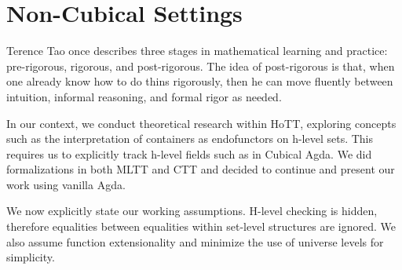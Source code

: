 \section{Non-Cubical Settings}

Terence Tao once describes three stages in mathematical learning and practice: pre-rigorous, rigorous, and post-rigorous. The idea of post-rigorous is that, when one already know how to do thins rigorously, then he can move fluently between intuition, informal reasoning, and formal rigor as needed.

In our context, we conduct theoretical research within HoTT, exploring concepts such as the interpretation of containers as endofunctors on h-level sets. This requires us to explicitly track h-level fields such as  in Cubical Agda. We did formalizations in both MLTT and CTT and decided to continue and present our work using vanilla Agda.

We now explicitly state our working assumptions. H-level checking is hidden, therefore equalities between equalities within set-level structures are ignored. We also assume function extensionality and minimize the use of universe levels for simplicity.